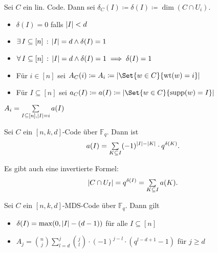 \documentclass{cheat-sheet}
\newcommand{\F}{\mathbb{F}} %
\DeclareMathOperator{\wt}{wt} %
\begin{document}
\begin{defn}
  Sei $C$ ein lin. Code.
  Dann sei $\delta_C(I) \coloneqq \delta(I) \coloneqq \dim(C \cap U_i)$.
\end{defn}

\begin{prop}
  \begin{itemize}
    \item $\delta(I) = 0$ falls $\lvert I\rvert < d$
    \item $\exists \, {I \subseteq [n]} \,:\, \lvert I\rvert = d \wedge \delta(I) = 1$
    \item $\forall \, {I \subseteq [n]} \,:\, \lvert I\rvert = d \wedge \delta(I) = 1 \implies \delta(I) = 1$
  \end{itemize}
\end{prop}

\begin{defn}
  \begin{minipage}[t]{0.88 \linewidth}
    \begin{itemize}
      \item Für $i \in [n]$ sei $A_C(i) \coloneqq A_i \coloneqq \abs{\Set{w \in C}{\wt(w) = i}}$
      \item Für $I \subseteq [n]$ sei $a_C(I) \coloneqq a(I) \coloneqq \abs{\Set{w \in C}{\supp(w) = I}}$
    \end{itemize}
  \end{minipage}
\end{defn}

\begin{bem}
  $A_i = \sum_{I \subseteq [n], \abs{I} = i} a(I)$
\end{bem}

\begin{satz}
  Sei $C$ ein $[n, k, d]$-Code über $\F_q$.
  Dann ist
  \[
    a(I) = \sum_{K \subseteq I} (-1)^{\abs{I} - \abs{K}} \cdot q^{\delta(K)}.
  \]
\end{satz}

\begin{bem}
  Es gibt auch eine invertierte Formel:
  \[
    \abs{C \cap U_I} = q^{\delta(I)} = \sum_{K \subseteq I} a(K).
  \]
\end{bem}


\begin{satz}
  Sei $C$ ein $[n, k, d]$-MDS-Code über $\F_q$. %
  Dann gilt
  \begin{itemize}
    \item $\delta(I) = \max ( 0, \lvert I\rvert - (d-1) )$ \enspace
    für alle $I \subseteq [n]$
    \item $A_j = \binom{n}{j} \sum_{l=d}^j \binom{j}{l} \cdot (-1)^{j-l} \cdot (q^{l-d+1} - 1)$ \enspace
    für $j \geq d$
  \end{itemize}
\end{satz}
\end{document}

